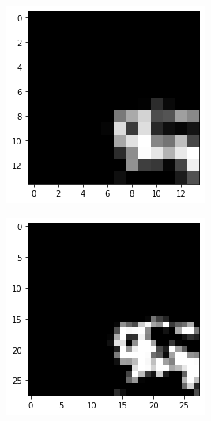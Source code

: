 \documentclass[10pt,twocolumn,hidelinks,letterpaper]{article}
\begin{document}
\begin{figure}
\begin{subfigure}{.59\linewidth}
\begin{subfigure}{.325\linewidth}
  	\end{subfigure}
  	\begin{subfigure}{.325\linewidth}
  		\includegraphics[width=\linewidth]{images/mmaps_example/downsampling14x14_gray.png}
  	\end{subfigure}
  	\begin{subfigure}{.325\linewidth}
  		\includegraphics[width=\linewidth]{images/mmaps_example/downsampling28x28_gray.png}
  	\end{subfigure}
  \end{subfigure}

	\caption{}
	\label{mmaps}
\end{figure}
\end{document}
